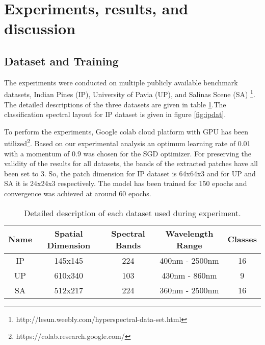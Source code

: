 \documentclass[journal]{IEEEtran}
\begin{document}
\section{Experiments, results, and discussion}

\begin{figure*}[]
\centering
{}\quad
{}\quad
{}\quad
{}\quad
\caption{Image cube, spectral ground truth, and spectral prediction for Indian Pines Dataset along with legend.}
\label{fig:ipdat}
\end{figure*} 




\subsection{Dataset and Training}
The experiments were conducted on multiple publicly available benchmark datasets, Indian Pines (IP), University of Pavia (UP), and Salinas Scene (SA) \footnote{http://lesun.weebly.com/hyperspectral-data-set.html}. The detailed descriptions of the three datasets are given in table \ref{tab:dataset}.The classification spectral layout for IP dataset is given in figure \ref{fig:ipdat}.

To perform the experiments, Google colab cloud platform with GPU has been utilized\footnote{https://colab.research.google.com/}. Based on our experimental analysis an optimum learning rate of 0.01 with a momentum of 0.9 was chosen for the SGD optimizer. For preserving the validity of the results for all datasets, the bands of the extracted patches have all been set to 3. So, the patch dimension for IP dataset is 64x64x3 and for UP and SA it is 24x24x3 respectively. The model has been trained for 150 epochs and convergence was achieved at around 60 epochs.


\begin{table}[]
    \centering
    \caption{Detailed description of each dataset used during experiment.}
    \begin{tabular}{c c c c c}
         Name & Spatial Dimension & Spectral Bands & Wavelength Range & Classes \\
         \hline
         IP & 145x145 & 224 & 400nm - 2500nm & 16 \\
         UP & 610x340 & 103 & 430nm - 860nm & 9 \\
         SA & 512x217 & 224 & 360nm - 2500nm & 16\\
         \hline
    \end{tabular}
    \label{tab:dataset}
\end{table}
\end{document}
